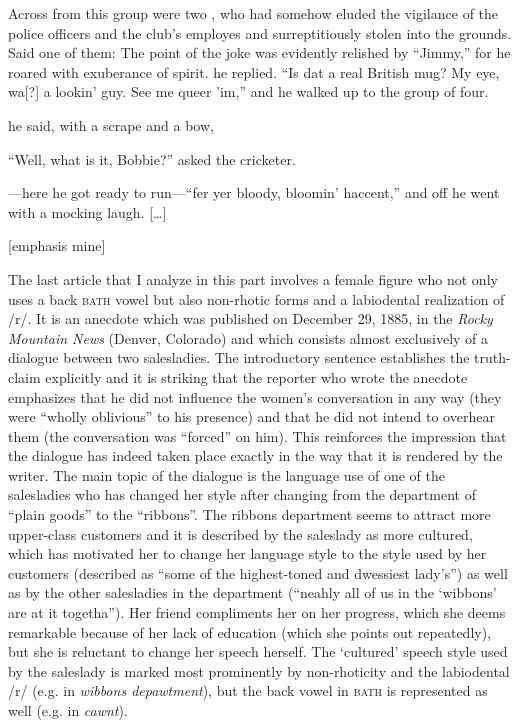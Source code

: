 \begin{ipquote}
Across from this group were two , who had somehow eluded the vigilance of the police officers and the club’s employes and surreptitiously stolen into the grounds. Said one of them:  The point of the joke was evidently relished by “Jimmy,” for he roared with exuberance of spirit.  he replied. “Is dat a real British mug? My eye, wa[?] a lookin’ guy. See me queer ’im,” and he walked up to the group of four.

 he said, with a scrape and a bow, 

{“Well, what is it, Bobbie?” asked the cricketer.

—here he got ready to run—“fer yer bloody, bloomin’ haccent,” and off he went with a mocking laugh. {[…]}

\raggedleft
{[emphasis mine]}\\}

\end{ipquote}

The last article that I analyze in this part involves a female figure who not only uses a back \textsc{bath} vowel but also non-rhotic forms and a labiodental realization of /r/. It is an anecdote which was published on December 29, 1885, in the \emph{Rocky Mountain News} (Denver, Colorado) and which consists almost exclusively of a dialogue between two salesladies. The introductory sentence establishes the truth-claim explicitly and it is striking that the reporter who wrote the anecdote emphasizes that he did not influence the women’s conversation in any way (they were “wholly oblivious” to his presence) and that he did not intend to overhear them (the conversation was “forced” on him). This reinforces the impression that the dialogue has indeed taken place exactly in the way that it is rendered by the writer. The main topic of the dialogue is the language use of one of the salesladies who has changed her style after changing from the department of “plain goods” to the “ribbons”. The ribbons department seems to attract more upper-class customers and it is described by the saleslady as more cultured, which has motivated her to change her language style to the style used by her customers (described as “some of the highest-toned and dwessiest lady’s”) as well as by the other salesladies in the department (“neahly all of us in the ‘wibbons’ are at it togetha”). Her friend compliments her on her progress, which she deems remarkable because of her lack of education (which she points out repeatedly), but she is reluctant to change her speech herself. The ‘cultured’ speech style used by the saleslady is marked most prominently by non-rhoticity and the labiodental /r/ (e.g. in \emph{wibbons depawtment}), but the back vowel in \textsc{bath} is represented as well (e.g. in \emph{cawnt}).

